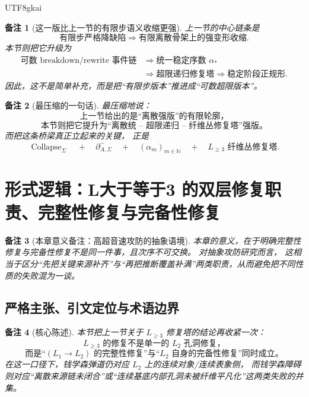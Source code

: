 \documentclass[12pt]{article}
\newtheorem{remark}{备注}[section]
\newcommand{\NN}{\mathbb{N}}
\newcommand{\Collapse}{\operatorname{Collapse}}
\begin{document}
\begin{CJK*}{UTF8}{gkai}
\begin{remark}[这一版比上一节的有限步语义收缩更强]
上一节的中心链条是
\[
  \text{有限步严格降缺陷}
  \Longrightarrow
  \text{有限离散骨架上的强变形收缩}.
\]
本节则把它升级为
\[
  \begin{aligned}
    \text{可数 breakdown/rewrite 事件链}
    &\Longrightarrow
    \text{统一稳定序数 }\alpha_\ast\\
    &\Longrightarrow
    \text{超限递归修复塔}
    \Longrightarrow
    \text{稳定阶段正规形}.
  \end{aligned}
\]
因此，这不是简单补充，而是把“有限步版本”推进成“可数超限版本”。
\end{remark}

\begin{remark}[最压缩的一句话]
最压缩地说：
\[
  \boxed{
    \text{上一节给出的是“离散强版”的有限轮廓，}
  }
\]
\[
  \boxed{
    \text{本节则把它提升为“离散统 -- 超限递归 -- 纤维丛修复塔”强版。}
  }
\]
而把这条桥梁真正立起来的关键，
正是
\[
  \Collapse_{\Sigma}
  \quad+\quad
  \partial^-_{A,\Sigma}
  \quad+\quad
  (\alpha_m)_{m\in\NN}
  \quad+\quad
  L_{\ge 3}\text{ 纤维丛修复塔}.
\]
\end{remark}

\clearpage
\section{形式逻辑：L大于等于3 的双层修复职责、完整性修复与完备性修复}
\label{sec:tex1-ch11}

\begin{remark}[本章意义备注：高超音速攻防的抽象语境]
本章的意义，在于明确完整性修复与完备性修复不是同一件事，且次序不可交换。
对抽象攻防研究而言，
这相当于区分“先把关键来源补齐”与“再把推断覆盖补满”两类职责，从而避免把不同性质的失败混为一谈。
\end{remark}

\subsection{严格主张、引文定位与术语边界}
\label{subsec:tex1-ch11-claim}

\begin{remark}[核心陈述]
本节把上一节关于 \(L_{\ge 3}\) 修复塔的结论再收紧一次：
\[
  \boxed{
    L_{\ge 3}\text{ 的修复不是单一的 }L_2\text{ 孔洞修复，}
  }
\]
\[
  \boxed{
    \text{而是“}(L_1\to L_2)\text{ 的完整性修复”与“}L_2\text{ 自身的完备性修复”同时成立。}
  }
\]
在这一口径下，钱学森弹道仍对应 \(L_2\) 上的连续对象/连续表象侧，
而钱学森障碍则对应“离散来源链未闭合”或“连续基底内部孔洞未被纤维平凡化”这两类失败的并集。
\end{remark}


\end{CJK*}
\end{document}
